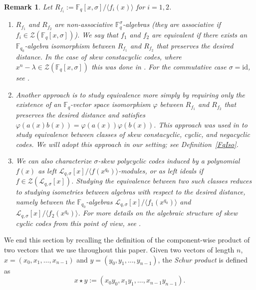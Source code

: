 \documentclass[12pt,paper]{article}
\newcommand{\hlc}[2][yellow]{ {\sethlcolor{#1} \hl{#2}} }
\theoremstyle{plain}
\newtheorem{remark}[theorem]{Remark}
\begin{document}
\begin{remark}
Let $R_{f_i} := \mathbb{F}_q[x, \sigma]/\langle f_i(x)\rangle$ for $i = 1,2$. 
\begin{enumerate}
    \item $R_{f_1}$ and $R_{f_2}$ are non-associative $\mathbb{F}_q^{\sigma}$-algebras (they are associative if $f_i \in \mathcal{Z}(\mathbb{F}_q[x, \sigma])$). We say that $f_1$ and $f_2$ are \emph{equivalent} if there exists an $ \mathbb{F}_{q_0}$-algebra isomorphism between $R_{f_1}$ and $R_{f_2}$ that preserves the desired distance. In the case of skew constacyclic codes, where $x^n - \lambda \in \mathcal{Z}(\mathbb{F}_q[x, \sigma])$ this was done in \cite[Section 6]{Lobillo2017}. For the commutative case $\sigma = \mathrm{id}$, see \cite{Chen2014,Chen2012,Equiv2025}.
    
    \item Another approach is to study equivalence more simply by requiring only the existence of an $\mathbb{F}_q$-vector space isomorphism $\varphi$ between $R_{f_1}$ and $R_{f_2}$ that preserves the desired distance and satisfies $\varphi(a(x)  b(x)) = \varphi(a(x)) \varphi(b(x))$. This approach was used in \cite{Boulanouar2021} to study equivalence between classes of skew constacyclic, cyclic, and negacyclic codes. We will adopt this approach in our setting; see Definition~\ref{FqIso}.
    \item We can also characterize $\sigma$-skew polycyclic codes induced by a polynomial $f(x)$ as left $\mathcal{L}_{q,\sigma}[x]/\langle f(x^{q_0}) \rangle$-modules, or as left ideals if $f \in \mathcal{Z}(\mathcal{L}_{q,\sigma}[x])$. Studying the equivalence between two such classes reduces to studying isometries between algebras with respect to the desired distance, namely between the $ \mathbb{F}_{q_0}$-algebras $\mathcal{L}_{q,\sigma}[x]/\langle f_1(x^{q_0}) \rangle$ and $\mathcal{L}_{q,\sigma}[x]/\langle f_2(x^{q_0}) \rangle$. For more details on the algebraic structure of skew cyclic codes from this point of view, see \cite{gabidulin2009rank,martinez2017roots}.
\end{enumerate}
\end{remark}

We end this section by recalling the definition of the component-wise product of two vectors that we use throughout this paper. Given two vectors of length $n$, $x = (x_0, x_1, \ldots, x_{n-1})$ and $y = (y_0, y_1, \ldots, y_{n-1})$, the \emph{Schur product} is defined as
$$
x \star y := (x_0 y_0, x_1 y_1, \ldots, x_{n-1} y_{n-1}) .
$$
\end{document}

